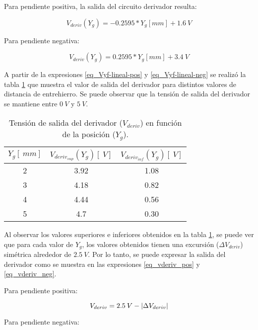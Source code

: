 Para pendiente positiva, la salida del circuito derivador resulta:

\begin{equation} \label{eq_Vyf-lineal-pos}
	V_{deriv}(Y_g) = -0.2595*Y_g[mm] + 1.6\:V
\end{equation}


Para pendiente negativa:

\begin{equation} \label{eq_Vyf-lineal-neg}
	V_{deriv}(Y_g) = 0.2595*Y_g[mm] + 3.4\:V
\end{equation}


A partir de la expresiones \ref{eq_Vyf-lineal-pos} y \ref{eq_Vyf-lineal-neg} se realizó la tabla \ref{tab_Vyf_vs_y} que muestra el valor de salida del derivador para distintos valores de distancia de entrehierro. Se puede observar que la tensión de salida del derivador se mantiene entre $0\:V$ y $5\:V$.

\begin{table}[H]
	\begin{center}
		\begin{tabular}{| c | c | c |}
			\hline
			$Y_g[\:mm]$ & $V_{deriv_{sup}}(Y_g) [\:V]$ & $V_{deriv_{inf}}(Y_g) [\:V]$
			\\ \hline
			2 & 3.92 & 1.08\\ \hline 
			3 & 4.18 & 0.82\\ \hline 
			4 & 4.44 & 0.56\\ \hline 
			5 & 4.7  & 0.30\\ \hline 
		\end{tabular}
		\caption{Tensión de salida del derivador ($V_{deriv}$) en función de la posición ($Y_g$).}
		\label{tab_Vyf_vs_y}
	\end{center}
\end{table}

Al observar los valores superiores e inferiores obtenidos en la tabla \ref{tab_Vyf_vs_y}, se puede ver que para cada valor de $Y_g$, los valores obtenidos tienen una excursión ($\Delta V_{deriv}$) simétrica alrededor de $2.5\:V$. Por lo tanto, se puede expresar la salida del derivador como se muestra en las expresiones \ref{eq_vderiv_pos} y \ref{eq_vderiv_neg}.

Para pendiente positiva:

\begin{equation}\label{eq_vderiv_pos}
	V_{deriv}=2.5\:V - \lvert\Delta V_{deriv}\rvert
\end{equation} 


Para pendiente negativa:

